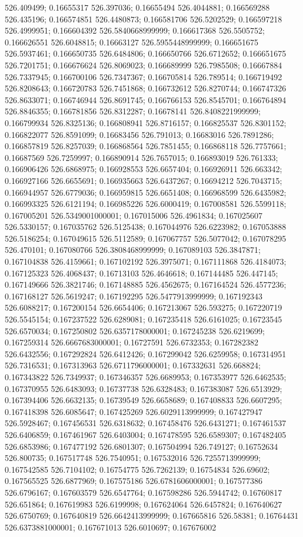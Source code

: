 526.409499; 0.16655317 526.397036; 0.16655494 526.4044881; 0.166569288 526.435196; 0.166574851 526.4480873; 0.166581706 526.5202529; 0.166597218 526.4999951; 0.166604392 526.5840668999999; 0.166617368 526.5505752; 0.166626551 526.6048815; 0.16663127 526.5955448999999; 0.166651675 526.5937461; 0.166650735 526.6484806; 0.166650766 526.6712652; 0.166651675 526.7201751; 0.166676624 526.8069023; 0.166689999 526.7985508; 0.16667884 526.7337945; 0.166700106 526.7347367; 0.166705814 526.789514; 0.166719492 526.8208643; 0.166720783 526.7451868; 0.166732612 526.8270744; 0.166747326 526.8633071; 0.166746944 526.8691745; 0.166766153 526.8545701; 0.166764894 526.8846355; 0.166781856 526.8312287; 0.16678141 526.8408221999999; 0.166799934 526.8325136; 0.166808941 526.8716157; 0.166825537 526.8301152; 0.166822077 526.8591099; 0.16683456 526.791013; 0.16683016 526.7891286; 0.166857819 526.8257039; 0.166868564 526.7851455; 0.166868118 526.7757661; 0.16687569 526.7259997; 0.166890914 526.7657015; 0.166893019 526.761333; 0.166906426 526.6868975; 0.166928553 526.6657404; 0.166926911 526.663342; 0.166927166 526.6655691; 0.166935663 526.6437267; 0.16694212 526.7043715; 0.166944957 526.6779036; 0.166959815 526.6651408; 0.166968599 526.6435982; 0.166993325 526.6121194; 0.166985226 526.6000419; 0.167008581 526.5599118; 0.167005201 526.5349001000001; 0.167015006 526.4961834; 0.167025607 526.5330157; 0.167035762 526.5125438; 0.167044976 526.6223982; 0.167053888 526.5186254; 0.167049615 526.5112589; 0.167067757 526.5077042; 0.167078295 526.470101; 0.167080766 526.3808468999999; 0.167089103 526.3847871; 0.167104838 526.4159661; 0.167102192 526.3975071; 0.167111868 526.4184073; 0.167125323 526.4068437; 0.16713103 526.4646618; 0.167144485 526.447145; 0.167149666 526.3821746; 0.167148885 526.4562675; 0.167164524 526.4577236; 0.167168127 526.5619247; 0.167192295 526.5477913999999; 0.167192343 526.6088217; 0.167200154 526.6654406; 0.167213067 526.593275; 0.167220719 526.5545154; 0.167237522 526.6289081; 0.167235418 526.6161025; 0.16723545 526.6570034; 0.167250802 526.6357178000001; 0.167245238 526.6219699; 0.167259314 526.6667683000001; 0.16727591 526.6732353; 0.167282382 526.6432556; 0.167292824 526.6412426; 0.167299042 526.6259958; 0.167314951 526.7316531; 0.167313963 526.6711796000001; 0.167332631 526.668824; 0.167343822 526.7349937; 0.167346357 526.6689953; 0.167353977 526.6462535; 0.167370955 526.6483093; 0.16737738 526.6328483; 0.167383087 526.6513929; 0.167394406 526.6632135; 0.16739549 526.6658689; 0.167408833 526.6607295; 0.167418398 526.6085647; 0.167425269 526.6029113999999; 0.167427947 526.5928467; 0.167456531 526.6318632; 0.167458476 526.6431271; 0.167461537 526.6406859; 0.167461967 526.6403004; 0.167478595 526.6589307; 0.167482405 526.6853986; 0.167477192 526.6801307; 0.167504994 526.749127; 0.16752634 526.800735; 0.167517748 526.7540951; 0.167532016 526.7255713999999; 0.167542585 526.7104102; 0.16754775 526.7262139; 0.16754834 526.69602; 0.167565525 526.6877969; 0.167575186 526.6781606000001; 0.167577386 526.6796167; 0.167603579 526.6547764; 0.167598286 526.5944742; 0.16760817 526.651864; 0.167619983 526.6199998; 0.167624064 526.6457824; 0.167640627 526.6750769; 0.167640819 526.6642413999999; 0.167665816 526.58381; 0.16764431 526.6373881000001; 0.167671013 526.6010697; 0.167676002 